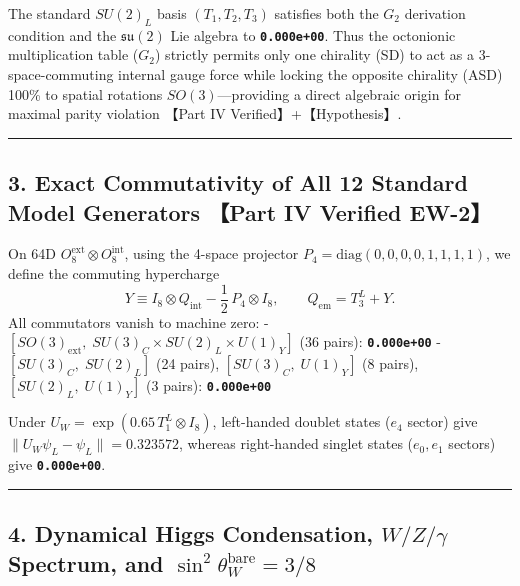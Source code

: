 \documentclass[
  a4paper,
]{article}
\begin{document}
The standard \(SU(2)_L\) basis \((T_1, T_2, T_3)\) satisfies both the
\(G_2\) derivation condition and the \(\mathfrak{su}(2)\) Lie algebra to
\textbf{\texttt{0.000e+00}}. Thus the octonionic multiplication table
(\(G_2\)) strictly permits only one chirality (SD) to act as a
3-space-commuting internal gauge force while locking the opposite
chirality (ASD) 100\% to spatial rotations \(SO(3)\)---providing a
direct algebraic origin for maximal parity violation 【Part IV
Verified】+【Hypothesis】.

\begin{center}\rule{0.5\linewidth}{0.5pt}\end{center}

\subsection{3. Exact Commutativity of All 12 Standard Model Generators
【Part IV Verified
EW-2】}\label{exact-commutativity-of-all-12-standard-model-generators-part-iv-verified-ew-2}

On 64D \(O_8^{\mathrm{ext}}\otimes O_8^{\mathrm{int}}\), using the
4-space projector \(P_4 = \mathrm{diag}(0,0,0,0,1,1,1,1)\), we define
the commuting hypercharge
\[Y \equiv I_8 \otimes Q_{\mathrm{int}} - \frac{1}{2}\, P_4 \otimes I_8, \qquad Q_{\mathrm{em}} = T_3^L + Y. \tag{1}\]
All commutators vanish to machine zero: -
\([SO(3)_{\mathrm{ext}},\; SU(3)_C \times SU(2)_L \times U(1)_Y]\) (36
pairs): \textbf{\texttt{0.000e+00}} - \([SU(3)_C,\; SU(2)_L]\) (24
pairs), \([SU(3)_C,\; U(1)_Y]\) (8 pairs), \([SU(2)_L,\; U(1)_Y]\) (3
pairs): \textbf{\texttt{0.000e+00}}

Under \(U_W = \exp(0.65\, T_1^L\otimes I_8)\), left-handed doublet
states (\(e_4\) sector) give
\(\|U_W\psi_L - \psi_L\| = \mathbf{0.323572}\), whereas right-handed
singlet states (\(e_0, e_1\) sectors) give \textbf{\texttt{0.000e+00}}.

\begin{center}\rule{0.5\linewidth}{0.5pt}\end{center}

\subsection{\texorpdfstring{4. Dynamical Higgs Condensation,
\(W/Z/\gamma\) Spectrum, and
\(\sin^2\theta_W^{\mathrm{bare}} = 3/8\)}{4. Dynamical Higgs Condensation, W/Z/\textbackslash gamma Spectrum, and \textbackslash sin\^{}2\textbackslash theta\_W\^{}\{\textbackslash mathrm\{bare\}\} = 3/8}}\label{dynamical-higgs-condensation-wzgamma-spectrum-and-sin2theta_wmathrmbare-38}
\end{document}
